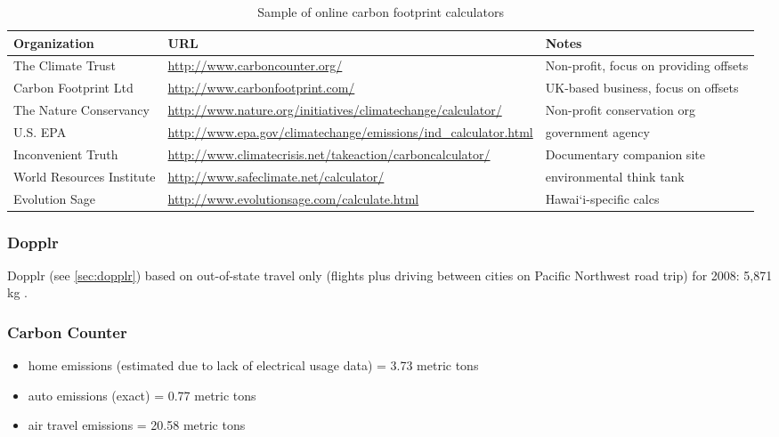\begin{table}[htbp]
	\begin{center}
		\scriptsize

		\begin{tabular}{| l | p{6.75cm} | p{5cm} |}
			\hline
			Organization & URL & Notes \\ \hline
			The Climate Trust & \url{http://www.carboncounter.org/} & Non-profit, focus on providing offsets \\ \hline
	
			Carbon Footprint Ltd & \url{http://www.carbonfootprint.com/} & UK-based business, focus on offsets \\ \hline
	
			The Nature Conservancy & \url{http://www.nature.org/initiatives/climatechange/calculator/} & Non-profit conservation org \\ \hline
	
			U.S. EPA & \url{http://www.epa.gov/climatechange/emissions/ind_calculator.html} & government agency \\ \hline

			Inconvenient Truth & \url{http://www.climatecrisis.net/takeaction/carboncalculator/} & Documentary companion site \\ \hline

			World Resources Institute & \url{http://www.safeclimate.net/calculator/} & environmental think tank \\ \hline

			Evolution Sage & \url{http://www.evolutionsage.com/calculate.html} & Hawai`i-specific calcs \\ \hline
		\end{tabular}
	\caption{Sample of online carbon footprint calculators}
	\label{tab:carbon-footprint-calculators}
	\end{center}
\end{table}

\subsubsection{Dopplr}
Dopplr (see \autoref{sec:dopplr}) based on out-of-state travel only (flights plus driving between cities on Pacific Northwest road trip) for 2008: 5,871 kg \COtwo.

\subsubsection{Carbon Counter}
\begin{itemize}
	\item home emissions (estimated due to lack of electrical usage data) = 3.73 metric tons \COtwo
	\item auto emissions (exact) = 0.77 metric tons \COtwo
	\item air travel emissions = 20.58 metric tons \COtwo
\end{itemize}

